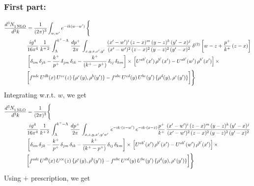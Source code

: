 \documentclass[9pt]{article}
\numberwithin{equation}{section}
\begin{document}
\subsubsection{First part:}
\begin{align}
    \frac{d^{3}N_{1\,\rm NLO}^{\rm}}{d^{3}k}  & = \frac{1}{(2\pi)^{3}}  \int_{w, w^\prime} e^{-ik(w-w^\prime)}\, \Bigg\{\notag \\ & \frac{ig^{4}}{16\pi^{4}}\, \frac{1}{k^{+\,2}}\,\int_{\Lambda}^{k^{+}-\Lambda}\, \frac{dp^{+}}{2\pi}\,\int_{x,y,z,x',y'}\,\frac{(x'-w')^{i}\,(z-x)^{m}\,(y-z)^{k}\,(y'-x)^{j}}{(x'-w')^{2}\,(z-x)^{2}\,(y-z)^{2}\,(y'-x)^{2}}\, \delta^{(2)}\left[w-z+\frac{p^{+}}{k^{+}}\,(z-x)\right]\notag \\ & \left[\delta_{im}\,\delta_{jk}-\frac{k^{+}}{p^{+}}\, \delta_{jm}\,\delta_{ik}-\frac{k^{+}}{(k^{+}-p^{+})}\, \delta_{ij}\,\delta_{km}\right]\times\, \left[U^{ab'}(x')\,\rho^{b'}(x')-U^{ab'}(w')\,\rho^{b'}(x')\right]\times\notag \\ & \bigg[f^{adc}\,U^{db}(x)\,U^{ce}(z)\, \{\rho^{e}(y),\rho^{b}(y')\}-f^{abc}\,U^{cd}(y)\,U^{be}(y')\, \{\rho^{d}(y),\rho^{e}(y')\}\bigg]\Bigg\}
\end{align}
Integrating w.r.t. $w$, we get
\begin{align}
     \frac{d^{3}N_{1\,\rm NLO}^{\rm}}{d^{3}k}  & = \frac{1}{(2\pi)^{3}} \Bigg\{\notag \\ &  \frac{ig^{4}}{16\pi^{4}}\, \frac{1}{k^{+\,2}}\,\int_{\Lambda}^{k^{+}-\Lambda}\, \frac{dp^{+}}{2\pi}\,\int_{x,z,y,x',y'w'}\,e^{-ik\cdot (z-w^\prime)}\,e^{-ik\cdot (x-z)}\frac{p^{+}}{k^{+}}\,\frac{(x'-w')^{i}\,(z-x)^{m}\,(y-z)^{k}\,(y'-x)^{j}}{(x'-w')^{2}\,(z-x)^{2}\,(y-z)^{2}\,(y'-x)^{2}}\,\notag \\ & \left[\delta_{im}\,\delta_{jk}-\frac{k^{+}}{p^{+}}\, \delta_{jm}\,\delta_{ik}-\frac{k^{+}}{(k^{+}-p^{+})}\, \delta_{ij}\,\delta_{km}\right]\times\, \left[U^{ab'}(x')\,\rho^{b'}(x')-U^{ab'}(w')\,\rho^{b'}(x')\right]\times\notag \\ & \bigg[f^{adc}\,U^{db}(x)\,U^{ce}(z)\, \{\rho^{e}(y),\rho^{b}(y')\}-f^{abc}\,U^{cd}(y)\,U^{be}(y')\, \{\rho^{d}(y),\rho^{e}(y')\}\bigg]\Bigg\}
\end{align}
Using $+$ prescription, we get
\end{document}
